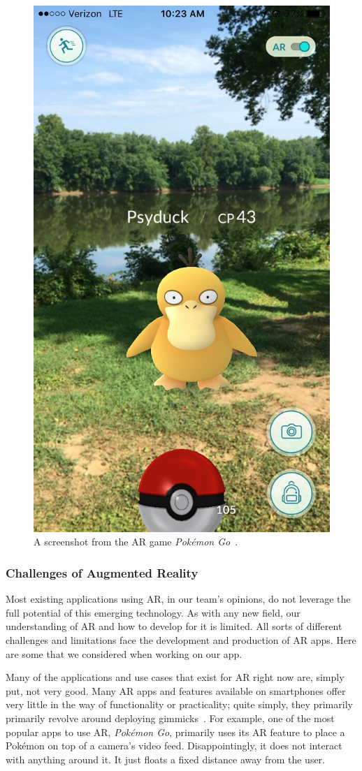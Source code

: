 \documentclass[a4paper, 10pt, american, titlepage]{article}
\begin{document}
\begin{figure}[h]
	\centering
	\includegraphics[width=.5\textwidth]{pokemon-go.jpg}
	\caption[A screenshot from the AR game \textit{Pokémon Go}]{A screenshot
		from the AR game \textit{Pokémon Go}~\autocite{vastateparks2016}.}
	\label{fig:pokemonGo}
\end{figure}

\subsubsection{Challenges of Augmented Reality}
\label{sec:challengesOfAugmentedReality}

Most existing applications using AR, in our team's opinions, do not leverage the
full potential of this emerging technology. As with any new field, our
understanding of AR and how to develop for it is limited. All sorts of different
challenges and limitations face the development and production of AR apps. Here
are some that we considered when working on our app.

Many of the applications and use cases that exist for AR right now are, simply
put, not very good. Many AR apps and features available on smartphones offer
very little in the way of functionality or practicality; quite simply, they
primarily primarily revolve around deploying
gimmicks~\autocite{theappsolutions2018}. For example, one of the most popular
apps to use AR, \textit{Pokémon Go}, primarily uses its AR feature to place a
Pokémon on top of a camera's video feed. Disappointingly, it does not interact
with anything around it. It just floats a fixed distance away from the user.
\end{document}

